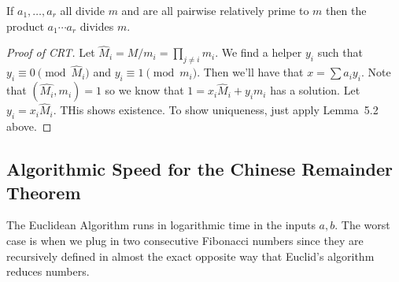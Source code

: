 \begin{lemma}
If $a_1, \dotsc, a_r$ all divide $m$ and are all pairwise relatively prime to $m$ then the product $a_1 \cdots a_r$ divides $m$.
\end{lemma}

\begin{proof}[Proof of CRT]
Let $\hat{M}_i = M/m_i = \prod_{j \not= i} m_i$. We find a helper $y_i$ such that $y_i \equiv 0 \pmod{\hat{M}_i}$ and $y_i \equiv 1 \pmod{m_i}$. Then we'll have that $x = \sum a_iy_i$. Note that $(\hat{M_i}, m_i) = 1$ so we know that $1 = x_i\hat{M}_i + y_im_i$ has a solution. Let $y_i = x_i\hat{M}_i$. THis shows existence. To show uniqueness, just apply Lemma~5.2 above.
\end{proof}

\subsection{Algorithmic Speed for the Chinese Remainder Theorem}

The Euclidean Algorithm runs in logarithmic time in the inputs $a,b$. The worst case is when we plug in two consecutive Fibonacci numbers since they are recursively defined in almost the exact opposite way that Euclid's algorithm reduces numbers.